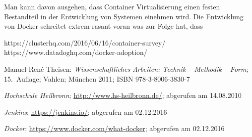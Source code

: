\documentclass[12pt,toc=bib,toc=listof]{scrreprt}
\begin{document}
Man kann davon ausgehen, dass Container Virtualisierung einen festen Bestandteil in der Entwicklung von Systemen einehmen wird.
Die Entwicklung von Docker schreitet extrem rasant voran was zur Folge hat, dass 




https://clusterhq.com/2016/06/16/container-survey/
https://www.datadoghq.com/docker-adoption/


\appendix
\begin{thebibliography}{99}
\raggedright
 Manuel René Theisen:
 \emph{Wissenschaftliches Arbeiten: Technik -- Methodik -- Form};
 15.~Auflage; Vahlen; München 2011;
 ISBN 978-3-8006-3830-7

 \emph{Hochschule Heilbronn};
 \url{http://www.hs-heilbronn.de/};
 abgerufen am 14.08.2010
 
 \emph{Jenkins};
 \url{https://jenkins.io/};
 abgerufen am 02.12.2016
 
 \emph{Docker};
 \url{https://www.docker.com/what-docker};
 abgerufen am 02.12.2016

 
 
 
 
 
 
\end{thebibliography}
\end{document}
